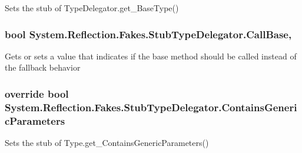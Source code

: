 Sets the stub of Type\-Delegator.\-get\-\_\-\-Base\-Type()

\hypertarget{class_system_1_1_reflection_1_1_fakes_1_1_stub_type_delegator_acc090984b16f0aaf890b004ef5fe80d6}{
\subsubsection[{Call\-Base}]{\setlength{\rightskip}{0pt plus 5cm}bool System.\-Reflection.\-Fakes.\-Stub\-Type\-Delegator.\-Call\-Base\hspace{0.3cm}{\ttfamily [get]}, {\ttfamily [set]}}}\label{class_system_1_1_reflection_1_1_fakes_1_1_stub_type_delegator_acc090984b16f0aaf890b004ef5fe80d6}


Gets or sets a value that indicates if the base method should be called instead of the fallback behavior

\hypertarget{class_system_1_1_reflection_1_1_fakes_1_1_stub_type_delegator_a4adf71780db70ba99f63a35934c4e5e4}{
\subsubsection[{Contains\-Generic\-Parameters}]{\setlength{\rightskip}{0pt plus 5cm}override bool System.\-Reflection.\-Fakes.\-Stub\-Type\-Delegator.\-Contains\-Generic\-Parameters\hspace{0.3cm}{\ttfamily [get]}}}\label{class_system_1_1_reflection_1_1_fakes_1_1_stub_type_delegator_a4adf71780db70ba99f63a35934c4e5e4}


Sets the stub of Type.\-get\-\_\-\-Contains\-Generic\-Parameters()

